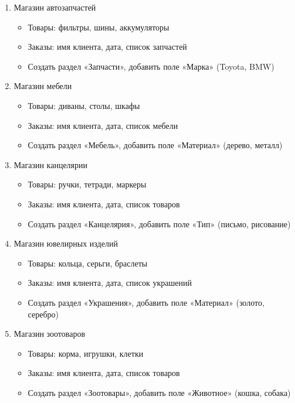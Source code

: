 \documentclass[12pt]{article}
\numberwithin{listing}{section}
\numberwithin{figure}{section}
\begin{document}
\begin{enumerate}
	\item Магазин автозапчастей
	      \begin{itemize}
		      \item Товары: фильтры, шины, аккумуляторы
		      \item Заказы: имя клиента, дата, список запчастей
		      \item Создать раздел «Запчасти», добавить поле «Марка» (Toyota, BMW)
	      \end{itemize}

	\item Магазин мебели
	      \begin{itemize}
		      \item Товары: диваны, столы, шкафы
		      \item Заказы: имя клиента, дата, список мебели
		      \item Создать раздел «Мебель», добавить поле «Материал» (дерево, металл)
	      \end{itemize}

	\item Магазин канцелярии
	      \begin{itemize}
		      \item Товары: ручки, тетради, маркеры
		      \item Заказы: имя клиента, дата, список товаров
		      \item Создать раздел «Канцелярия», добавить поле «Тип» (письмо, рисование)
	      \end{itemize}

	\item Магазин ювелирных изделий
	      \begin{itemize}
		      \item Товары: кольца, серьги, браслеты
		      \item Заказы: имя клиента, дата, список украшений
		      \item Создать раздел «Украшения», добавить поле «Материал» (золото, серебро)
	      \end{itemize}

	      \newpage

	\item Магазин зоотоваров
	      \begin{itemize}
		      \item Товары: корма, игрушки, клетки
		      \item Заказы: имя клиента, дата, список товаров
		      \item Создать раздел «Зоотовары», добавить поле «Животное» (кошка, собака)
	      \end{itemize}


\end{enumerate}
\end{document}
